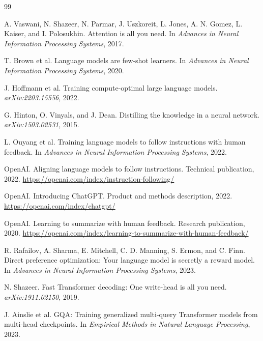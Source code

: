 \documentclass[11pt,a4paper]{article}
\begin{document}
\begin{thebibliography}{99}

A. Vaswani, N. Shazeer, N. Parmar, J. Uszkoreit, L. Jones, A. N. Gomez, L. Kaiser, and I. Polosukhin.
\newblock Attention is all you need.
\newblock In \emph{Advances in Neural Information Processing Systems}, 2017.

T. Brown et al.
\newblock Language models are few-shot learners.
\newblock In \emph{Advances in Neural Information Processing Systems}, 2020.

J. Hoffmann et al.
\newblock Training compute-optimal large language models.
\newblock \emph{arXiv:2203.15556}, 2022.

G. Hinton, O. Vinyals, and J. Dean.
\newblock Distilling the knowledge in a neural network.
\newblock \emph{arXiv:1503.02531}, 2015.

L. Ouyang et al.
\newblock Training language models to follow instructions with human feedback.
\newblock In \emph{Advances in Neural Information Processing Systems}, 2022.

OpenAI.
\newblock Aligning language models to follow instructions.
\newblock Technical publication, 2022. \url{https://openai.com/index/instruction-following/}

OpenAI.
\newblock Introducing ChatGPT.
\newblock Product and methods description, 2022. \url{https://openai.com/index/chatgpt/}

OpenAI.
\newblock Learning to summarize with human feedback.
\newblock Research publication, 2020. \url{https://openai.com/index/learning-to-summarize-with-human-feedback/}

R. Rafailov, A. Sharma, E. Mitchell, C. D. Manning, S. Ermon, and C. Finn.
\newblock Direct preference optimization: Your language model is secretly a reward model.
\newblock In \emph{Advances in Neural Information Processing Systems}, 2023.

N. Shazeer.
\newblock Fast Transformer decoding: One write-head is all you need.
\newblock \emph{arXiv:1911.02150}, 2019.

J. Ainslie et al.
\newblock GQA: Training generalized multi-query Transformer models from multi-head checkpoints.
\newblock In \emph{Empirical Methods in Natural Language Processing}, 2023.


\end{thebibliography}
\end{document}
